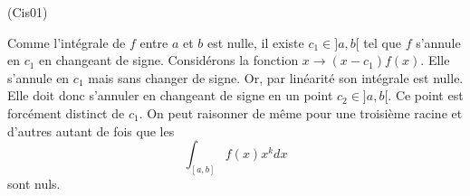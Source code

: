 \begin{tiny}(Cis01)\end{tiny} Comme l'intégrale de $f$ entre $a$ et $b$ est nulle, il existe $c_1\in]a,b[$ tel que $f$ s'annule en $c_1$ en changeant de signe.\newline
Considérons la fonction $x\rightarrow (x-c_1)f(x)$. Elle s'annule en $c_1$ mais sans changer de signe. Or, par linéarité son intégrale est nulle. Elle doit donc s'annuler en changeant de signe en un point $c_2\in ]a,b[$. Ce point est forcément distinct de $c_1$. On peut raisonner de même pour une troisième racine et d'autres autant de fois que les
\begin{displaymath}
 \int_{[a,b]}f(x)x^kdx
\end{displaymath}
sont nuls.